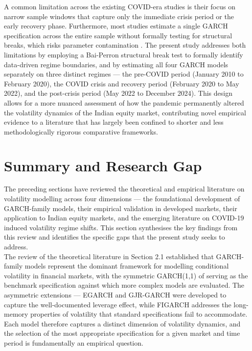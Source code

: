 A common limitation across the existing COVID-era studies is their focus on narrow sample windows that capture only the immediate crisis period or the early recovery phase. Furthermore, most studies estimate a single GARCH specification across the entire sample without formally testing for structural breaks, which risks parameter contamination . The present study addresses both limitations by employing a Bai-Perron structural break test to formally identify data-driven regime boundaries, and by estimating all four GARCH models separately on three distinct regimes — the pre-COVID period (January 2010 to February 2020), the COVID crisis and recovery period (February 2020 to May 2022), and the post-crisis period (May 2022 to December 2024). This design allows for a more nuanced assessment of how the pandemic permanently altered the volatility dynamics of the Indian equity market, contributing novel empirical evidence to a literature that has largely been confined to shorter and less methodologically rigorous comparative frameworks.

\section{Summary and Research Gap}

The preceding sections have reviewed the theoretical and empirical literature on volatility modelling across four dimensions — the foundational development of GARCH-family models, their empirical validation in developed markets, their application to Indian equity markets, and the emerging literature on COVID-19 induced volatility regime shifts. This section synthesises the key findings from this review and identifies the specific gaps that the present study seeks to address.\\
The review of the theoretical literature in Section 2.1 established that GARCH-family models represent the dominant framework for modelling conditional volatility in financial markets, with the symmetric GARCH(1,1) of \cite{bollerslev1986} serving as the benchmark specification against which more complex models are evaluated. The asymmetric extensions — EGARCH \cite{nelson1991conditional} and \cite{glosten1993}GJR-GARCH  were developed to capture the well-documented leverage effect, while FIGARCH \cite{baillie1996} addresses the long-memory properties of volatility that standard specifications fail to accommodate. Each model therefore captures a distinct dimension of volatility dynamics, and the selection of the most appropriate specification for a given market and time period is fundamentally an empirical question.\\

